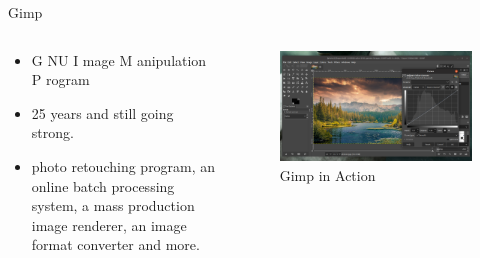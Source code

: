 \documentclass[presentation]{beamer}
\begin{document}
\begin{frame}[label={sec:org1187a2d}]{Gimp}
\begin{columns}
\begin{column}{0.5\columnwidth}
\begin{itemize}
\item \alert{G} NU  \alert{I} mage  \alert{M} anipulation  \alert{P} rogram
\item 25 years and still going strong.
\item photo retouching program, an online batch processing system, a mass production image renderer, an image format converter and more.
\end{itemize}
\end{column}
\begin{column}{0.5\columnwidth}
\begin{figure}[htbp]
\centering
\includegraphics[width=.9\linewidth]{././gimp.png}
\caption{Gimp in Action}
\end{figure}
\end{column}
\end{columns}
\end{frame}
\end{document}
